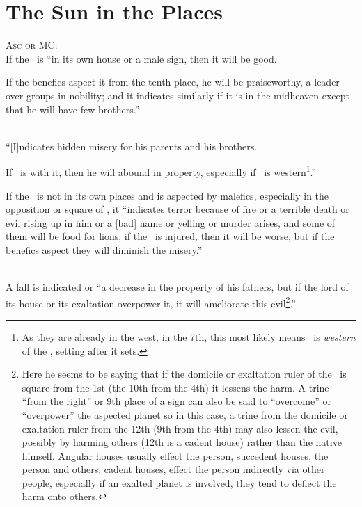 \section{The Sun in the Places}
\textsc{Asc or MC:} \\
\indent If the \Sun\, is ``in its own house or a male sign, then it will be good. 

If the benefics aspect it from the tenth place, he will be praiseworthy, a leader over groups in nobility; and it indicates similarly if it is in the midheaven except that he will have few brothers.''

\\
\indent ``[I]ndicates hidden misery for his parents and his brothers.

If \Mercury\, is with it, then he will abound in property, especially if \Mercury\, is western\footnote{As they are already in the west, in the 7th, this most likely means \Mercury\, is \textsl{western} of the \Sun, setting after it sets.}.''

If the \Sun\, is not in its own places and is aspected by malefics, especially in the opposition or square of \Mars, it ``indicates terror because of fire or a terrible death or evil rising up in him or a [bad] name or yelling or murder arises, and some of them will be food for lions; if the \Moon\, is injured, then it will be worse, but if the benefics aspect they will diminish the misery.''

 \\
\indent A fall is indicated or ``a decrease in the property of his fathers, but if the lord of its house or its exaltation overpower it, it will ameliorate this evil\footnote{Here he seems to be saying that if the domicile or exaltation ruler of the \Sun\, is square from the 1st (the 10th from the 4th) it lessens the harm. A trine ``from the right'' or 9th place of a sign can also be said to ``overcome'' or ``overpower'' the aspected planet so in this case, a trine from the domicile or exaltation ruler from the 12th (9th from the 4th) may also lessen the evil, possibly by harming others (12th is a cadent house) rather than the native himself. Angular houses usually effect the person, succedent houses, the person and others, cadent houses, effect the person indirectly via other people, especially if an exalted planet is involved, they tend to deflect the harm onto others.}.''
